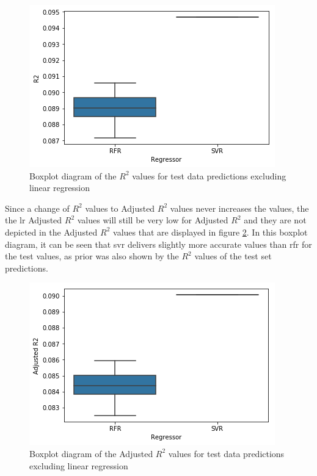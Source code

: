 \documentclass[a4paper, 11pt, oneside]{Thesis}  %
\begin{document}
\begin{figure}[h]
\includegraphics[scale=0.7]{Figures/Regressor_comparison/boxplot_r2_test_data_without_lr.png}
\centering
\caption{Boxplot diagram of the $R^2$ values for test data predictions excluding linear regression}
\label{fig:boxplot_r2_test_data_without_lr}
\end{figure}

Since a change of $R^2$ values to Adjusted $R^2$ values never increases the values, the the \ac{lr} Adjusted $R^2$ values will still be very low for Adjusted $R^2$ and they are not depicted in the Adjusted $R^2$ values that are displayed in figure \ref{fig:boxplot_adj_r2_test_data_without_lr}. In this boxplot diagram, it can be seen that \ac{svr} delivers slightly more accurate values than \ac{rfr} for the test values, as prior was also shown by the $R^2$ values of the test set predictions.

\begin{figure}[h]
\includegraphics[scale=0.7]{Figures/Regressor_comparison/boxplot_adj_r2_test_data_without_lr.png}
\centering
\caption{Boxplot diagram of the Adjusted $R^2$ values for test data predictions excluding linear regression}
\label{fig:boxplot_adj_r2_test_data_without_lr}
\end{figure}
\end{document}
